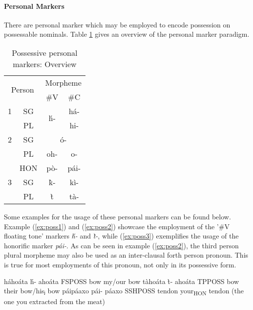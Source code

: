 \documentclass[a4paper, 12pt, oneside]{memoir}
\newcommand{\emh}[1]{\textit{#1}}
\begin{document}
\paragraph{Personal Markers}\label{spossmarker}
There are personal marker which may be employed to encode possession on possessable nominals. Table \ref{tpossmarker} gives an overview of the personal marker paradigm.
\begin{table}[H]
\centering
\begin{tabular}{@{}cccc@{}}
\toprule
\multicolumn{2}{c}{\multirow{2}{*}{Person}} & \multicolumn{2}{c}{Morpheme} \\ \cmidrule(l){3-4} 
\multicolumn{2}{c}{} & \#V & \#C \\ \midrule
1 & SG & \multirow{2}{*}{h́-} & há- \\ \cmidrule(lr){2-2}
 & PL &  & hi- \\ \cmidrule(lr){2-2}
2 & SG & \multicolumn{2}{c}{ó-} \\ \cmidrule(lr){2-2}
 & PL & oh- & o- \\ \cmidrule(lr){2-2}
 & HON & pò- & pái- \\ \cmidrule(lr){2-2}
3 & SG & k̀- & kì- \\ \cmidrule(lr){2-2}
 & PL & t̀& tà- \\ \bottomrule
\end{tabular}
\caption{Possessive personal markers: Overview}
\label{tpossmarker}
\end{table}
Some examples for the usage of these personal markers can be found below. Example (\ref{ex:poss1}) and (\ref{ex:poss2}) showcase the employment of the '\#V floating tone' markers \emh{h́-} and \emh{t̀-}, while (\ref{ex:poss3}) exemplifies the usage of the honorific marker \emh{pái-}. As can be seen in example (\ref{ex:poss2}), the third person plural morpheme may also be used as an inter-clausal forth person pronoun. This is true for most employments of this pronoun, not only in its possessive form.
\begin{examples}
\ex
\label{ex:poss1}
\words háhoáta
\bits h́- ahoáta
\gloss FSPOSS bow
\tr my/our bow
\ex
\label{ex:poss2}
\words tàhoáta
\bits t̀- ahoáta
\gloss TPPOSS bow
\tr their bow/hisⱼ bow
\ex 
\label{ex:poss3}
\words páipáaxo
\bits pái- páaxo
\gloss SSHPOSS tendon
\tr your\textsubscript{HON} tendon (the one you extracted from the meat)
\end{examples}
\end{document}
